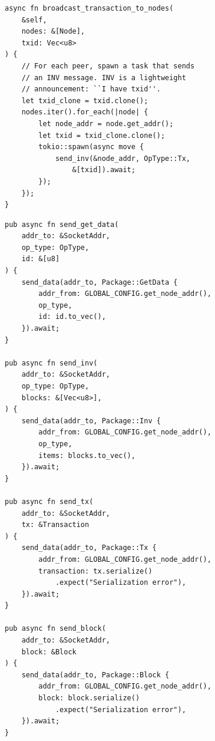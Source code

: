 \begin{listing}[htbp]
\caption{Broadcast tx inventory to peers ()}
\label{lst:9-9-12}
\begin{verbatim}
async fn broadcast_transaction_to_nodes(
    &self,
    nodes: &[Node],
    txid: Vec<u8>
) {
    // For each peer, spawn a task that sends
    // an INV message. INV is a lightweight
    // announcement: ``I have txid''.
    let txid_clone = txid.clone();
    nodes.iter().for_each(|node| {
        let node_addr = node.get_addr();
        let txid = txid_clone.clone();
        tokio::spawn(async move {
            send_inv(&node_addr, OpType::Tx,
                &[txid]).await;
        });
    });
}
\end{verbatim}
\end{listing}

\begin{listing}[htbp]
\caption{P2P send primitives (, , , )}
\label{lst:9-9-13}
\begin{verbatim}
pub async fn send_get_data(
    addr_to: &SocketAddr,
    op_type: OpType,
    id: &[u8]
) {
    send_data(addr_to, Package::GetData {
        addr_from: GLOBAL_CONFIG.get_node_addr(),
        op_type,
        id: id.to_vec(),
    }).await;
}

pub async fn send_inv(
    addr_to: &SocketAddr,
    op_type: OpType,
    blocks: &[Vec<u8>],
) {
    send_data(addr_to, Package::Inv {
        addr_from: GLOBAL_CONFIG.get_node_addr(),
        op_type,
        items: blocks.to_vec(),
    }).await;
}

pub async fn send_tx(
    addr_to: &SocketAddr,
    tx: &Transaction
) {
    send_data(addr_to, Package::Tx {
        addr_from: GLOBAL_CONFIG.get_node_addr(),
        transaction: tx.serialize()
            .expect("Serialization error"),
    }).await;
}

pub async fn send_block(
    addr_to: &SocketAddr,
    block: &Block
) {
    send_data(addr_to, Package::Block {
        addr_from: GLOBAL_CONFIG.get_node_addr(),
        block: block.serialize()
            .expect("Serialization error"),
    }).await;
}
\end{verbatim}
\end{listing}

